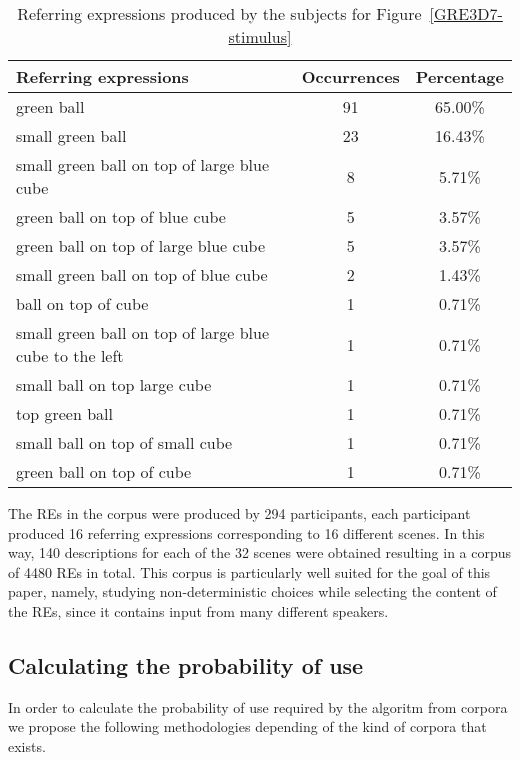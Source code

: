 \begin{table}
\begin{center}
\begin{tabular}{|l|c|c|}
\hline
Referring expressions & Occurrences & Percentage \\
\hline
green ball & 91 & 65.00\% \\
small green ball & 23 & 16.43\% \\
small green ball on top of large blue cube & 8 & 5.71\% \\
green ball on top of blue cube & 5 & 3.57\% \\
green ball on top of large blue cube & 5 & 3.57\% \\
small green ball on top of blue cube & 2 & 1.43\% \\
ball on top of cube & 1 & 0.71\% \\
small green ball on top of large blue cube to the left & 1 & 0.71\% \\
small ball on top large cube & 1 & 0.71\% \\
top green ball & 1 & 0.71\% \\
small ball on top of small cube & 1 & 0.71\% \\
green ball on top of cube & 1 & 0.71\% \\
\hline
\end{tabular}
\caption{Referring expressions produced by the subjects for Figure~\ref{GRE3D7-stimulus}\label{corpus-distribution}}
\end{center}
\end{table}

The REs in the corpus were produced by 294 participants, each participant produced 16 referring expressions corresponding to 16 different scenes. In this way, 140 descriptions for each of the 32 scenes were obtained resulting in a corpus of 4480 REs in total. This corpus is particularly well suited for the goal of this paper, namely, studying non-deterministic choices while selecting the content of the REs, since it contains input from many different speakers. 


\subsection{Calculating the probability of use}

In order to calculate the probability of use required by the algoritm from corpora we propose the following methodologies depending of the kind of corpora that exists.

